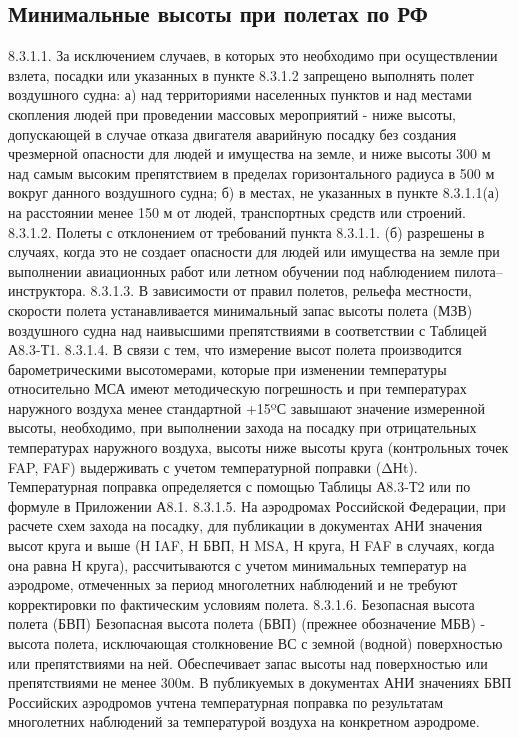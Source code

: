 \subsection{Минимальные высоты при полетах по РФ}
8.3.1.1. За исключением случаев, в которых это необходимо при осуществлении взлета, посадки или указанных в пункте 8.3.1.2 запрещено выполнять полет воздушного судна: 
а)	над территориями населенных пунктов и над местами скопления людей при проведении массовых мероприятий - ниже высоты, допускающей в случае отказа двигателя аварийную посадку без создания чрезмерной опасности для людей и имущества на земле, и ниже высоты 300 м над самым высоким препятствием в пределах горизонтального радиуса в 500 м вокруг данного воздушного судна;
б)	в местах, не указанных в пункте 8.3.1.1(а) на расстоянии менее 150 м от людей, транспортных средств или строений. 
8.3.1.2. Полеты с отклонением от требований пункта 8.3.1.1. (б) разрешены в случаях, когда это не создает опасности для людей или имущества на земле при выполнении авиационных работ или летном обучении под наблюдением пилота–инструктора. 
8.3.1.3. В зависимости от правил полетов, рельефа местности, скорости полета устанавливается минимальный запас высоты полета (МЗВ) воздушного судна над наивысшими препятствиями в соответствии с Таблицей А8.3-Т1.
8.3.1.4. В связи с тем, что измерение высот полета производится барометрическими высотомерами, которые при изменении температуры относительно МСА имеют методическую погрешность и при температурах наружного воздуха менее стандартной +15ºС завышают значение измеренной высоты, необходимо, при выполнении захода на посадку при отрицательных температурах наружного воздуха, высоты ниже высоты круга (контрольных точек FAP, FAF) выдерживать с учетом температурной поправки (ΔНt). 
Температурная поправка определяется с помощью Таблицы А8.3-Т2 или по формуле в Приложении А8.1.
8.3.1.5. На аэродромах Российской Федерации, при расчете схем захода на посадку, для публикации в документах АНИ значения высот круга и выше (Н IAF, Н БВП, Н MSA, Н круга, Н FAF в случаях, когда она равна Н круга), рассчитываются с учетом минимальных температур на аэродроме, отмеченных за период многолетних наблюдений и не требуют корректировки по фактическим условиям полета. 
8.3.1.6. Безопасная высота полета (БВП) 
Безопасная высота полета (БВП) (прежнее обозначение МБВ) - высота полета, исключающая столкновение ВС с земной (водной) поверхностью или препятствиями на ней. Обеспечивает запас высоты над поверхностью или препятствиями не менее 300м. В публикуемых в документах АНИ значениях БВП Российских аэродромов учтена температурная поправка по результатам многолетних наблюдений за температурой воздуха на конкретном аэродроме.
